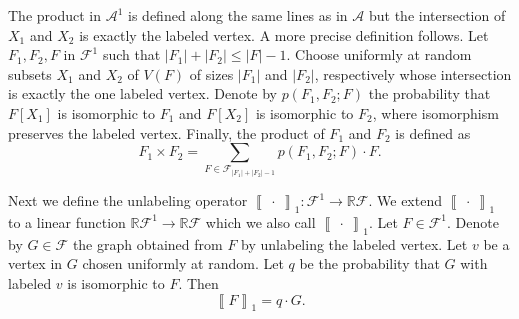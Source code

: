 \documentclass[12pt]{article}
\theoremstyle{definition}
\theoremstyle{remark}
\renewcommand{\leq}{\leqslant}
\begin{document}
The product in $\mathcal{A}^1$ is defined along the same lines as in $\mathcal{A}$ but the intersection of $X_1$ and $X_2$ is exactly the labeled vertex. A more precise definition follows.
Let $F_1,F_2,F$ in $\mathcal{F}^1$ such that $|F_1| + |F_2| \leq  |F|-1$.
Choose uniformly at random subsets $X_1$ and $X_2$ of $V(F)$ of sizes $|F_1|$ and $|F_2|$, respectively whose intersection is exactly the one labeled vertex.
Denote by $p(F_1,F_2;F)$ the probability that $F[X_1]$ is isomorphic to $F_1$ and $F[X_2]$ is isomorphic to $F_2$, where isomorphism preserves the labeled vertex.
Finally, the product of $F_1$ and $F_2$ is defined as
\[
	F_1 \times F_2 = \sum_{F \in \mathcal{F}_{|F_1|+|F_2|-1}} p(F_1,F_2;F)\cdot F.
\]

Next we define the unlabeling operator $\left\llbracket\  \cdot\ \right\rrbracket_1: \mathcal{F}^1 \to \mathbb{R}\mathcal{F}$. We extend  $\left\llbracket\  \cdot\ \right\rrbracket_1$ to a linear function $\mathbb{R}\mathcal{F}^1 \to \mathbb{R}\mathcal{F}$ which we also call $\left\llbracket\  \cdot\ \right\rrbracket_1$.
Let $F \in \mathcal{F}^1$. Denote by $G \in \mathcal{F}$ the graph obtained from $F$ by unlabeling the labeled vertex.  
Let $v$ be a vertex in $G$ chosen uniformly at random. 
Let $q$ be the probability that $G$ with labeled $v$ is isomorphic to $F$. Then 
\[
\left\llbracket F \right\rrbracket_1 = q \cdot G.
\]
\end{document}

